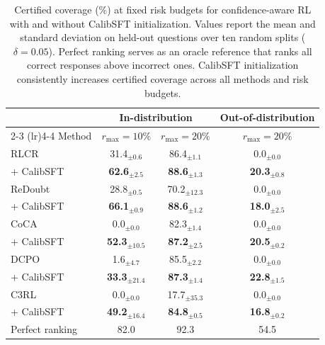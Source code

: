 

\begin{table}[t]
    \centering
    \caption{Certified coverage (\%) at fixed risk budgets for confidence-aware RL with and without CalibSFT initialization. 
    Values report the mean and standard deviation on held-out questions over ten random splits ($\delta=0.05$). 
    Perfect ranking serves as an oracle reference that ranks all correct responses above incorrect ones. 
    CalibSFT initialization consistently increases certified coverage across all methods and risk budgets.}
    \label{tab:risk_control}
    \footnotesize
    \setlength{\tabcolsep}{5pt}
    \begin{tabular}{lccc}
        \toprule
        & \multicolumn{2}{c}{In-distribution} & Out-of-distribution \\
        \cmidrule(lr){2-3} \cmidrule(lr){4-4}
        Method & $r_{\max}=10\%$ & $r_{\max}=20\%$ & $r_{\max}=20\%$ \\
        \midrule
        RLCR & 31.4$_{\pm 0.6}$ & 86.4$_{\pm 1.1}$ & 0.0$_{\pm 0.0}$ \\
        \rowcolor{calibrow} + CalibSFT & \textbf{62.6$_{\pm 2.5}$} & \textbf{88.6$_{\pm 1.3}$} & \textbf{20.3$_{\pm 0.8}$} \\
        \midrule
        ReDoubt & 28.8$_{\pm 0.5}$ & 70.2$_{\pm 12.3}$ & 0.0$_{\pm 0.0}$ \\
        \rowcolor{calibrow} + CalibSFT & \textbf{66.1$_{\pm 0.9}$} & \textbf{88.6$_{\pm 1.2}$} & \textbf{18.0$_{\pm 2.5}$} \\
        \midrule
        CoCA & 0.0$_{\pm 0.0}$ & 82.3$_{\pm 1.4}$ & 0.0$_{\pm 0.0}$ \\
        \rowcolor{calibrow} + CalibSFT & \textbf{52.3$_{\pm 10.5}$} & \textbf{87.2$_{\pm 2.5}$} & \textbf{20.5$_{\pm 0.2}$} \\
        \midrule
        DCPO & 1.6$_{\pm 4.7}$ & 85.5$_{\pm 2.2}$ & 0.0$_{\pm 0.0}$ \\
        \rowcolor{calibrow} + CalibSFT & \textbf{33.3$_{\pm 21.4}$} & \textbf{87.3$_{\pm 1.4}$} & \textbf{22.8$_{\pm 1.5}$} \\
        \midrule
        C3RL & 0.0$_{\pm 0.0}$ & 17.7$_{\pm 35.3}$ & 0.0$_{\pm 0.0}$ \\
        \rowcolor{calibrow} + CalibSFT & \textbf{49.2$_{\pm 16.4}$} & \textbf{84.8$_{\pm 0.5}$} & \textbf{16.8$_{\pm 0.2}$} \\
        \midrule
        Perfect ranking & 82.0 & 92.3 & 54.5 \\
        \bottomrule
    \end{tabular}
\end{table}
